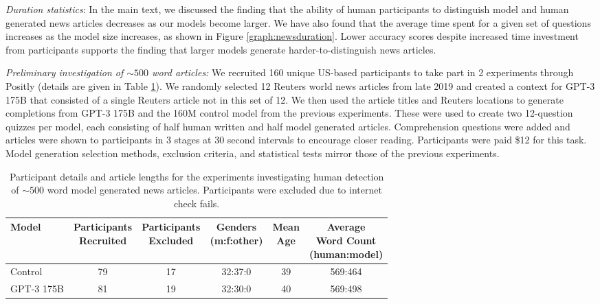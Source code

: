 \documentclass{article}
\begin{document}
\textit{Duration statistics}: In the main text, we discussed the finding that the ability of human participants to distinguish model and human generated news articles decreases as our models become larger. We have also found that the average time spent for a given set of questions increases as the model size increases, as shown in Figure \ref{graph:newsduration}. Lower accuracy scores despite increased time investment from participants supports the finding that larger models generate harder-to-distinguish news articles.

\textit{Preliminary investigation of $\sim500$ word articles:} We recruited 160 unique US-based participants to take part in 2 experiments through Positly (details are given in Table \ref{table:study_long}). We randomly selected 12 Reuters world news articles from late 2019 and created a context for GPT-3 175B that consisted of a single Reuters article not in this set of 12. We then used the article titles and Reuters locations to generate completions from GPT-3 175B and the 160M control model from the previous experiments. These were used to create two 12-question quizzes per model, each consisting of half human written and half model generated articles. Comprehension questions were added and articles were shown to participants in 3 stages at 30 second intervals to encourage closer reading. Participants were paid \$12 for this task. Model generation selection methods, exclusion criteria, and statistical tests mirror those of the previous experiments.

\begin{table}
    \begin{center}
        \begin{tabular}{l c c c c c}
        \toprule
        Model & \shortstack{Participants\\Recruited}  & \shortstack{Participants\\Excluded} & \shortstack{Genders\\(m:f:other)} & \shortstack{Mean\\Age} & \shortstack{Average\\Word Count\\(human:model)} \\ 
        \midrule
        Control  & 79 & 17 & 32:37:0 & 39 & 569:464 \\ 
        GPT-3 175B & 81 & 19  & 32:30:0 &  40 & 569:498 \\ 
        \bottomrule
        \end{tabular}
    \end{center}
    \caption{Participant details and  article lengths for the experiments investigating  human detection of $\sim500$ word model generated news articles. Participants were excluded due to internet check fails.}
    \label{table:study_long}
\end{table}
\end{document}
